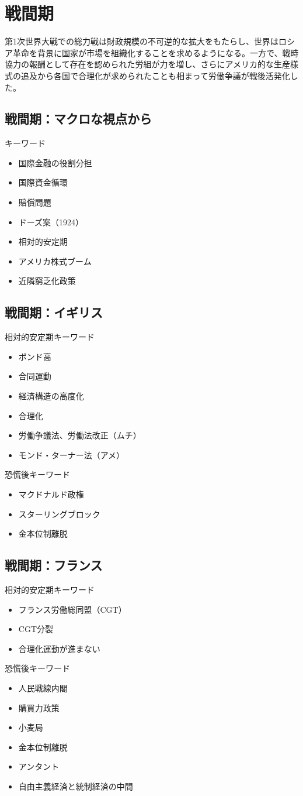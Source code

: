 \documentclass{jsarticle}
\begin{document}
\section{戦間期}
第1次世界大戦での総力戦は財政規模の不可逆的な拡大をもたらし、世界はロシア革命を背景に国家が市場を組織化することを求めるようになる。一方で、戦時協力の報酬として存在を認められた労組が力を増し、さらにアメリカ的な生産様式の追及から各国で合理化が求められたことも相まって労働争議が戦後活発化した。
\subsection{戦間期：マクロな視点から}
キーワード
\begin{itemize}
\item 国際金融の役割分担
\item 国際資金循環
\item 賠償問題
\item ドーズ案（1924）
\item 相対的安定期
\item アメリカ株式ブーム
\item 近隣窮乏化政策
\end{itemize}

\subsection{戦間期：イギリス}
相対的安定期キーワード
\begin{itemize}
\item ポンド高
\item 合同運動
\item 経済構造の高度化
\item 合理化
\item 労働争議法、労働法改正（ムチ）
\item モンド・ターナー法（アメ）
\end{itemize}
恐慌後キーワード
\begin{itemize}
\item マクドナルド政権
\item スターリングブロック
\item 金本位制離脱
\end{itemize}

\subsection{戦間期：フランス}
相対的安定期キーワード
\begin{itemize}
\item フランス労働総同盟（CGT）
\item CGT分裂
\item 合理化運動が進まない
\end{itemize}
恐慌後キーワード
\begin{itemize}
\item 人民戦線内閣
\item 購買力政策
\item 小麦局
\item 金本位制離脱
\item アンタント
\item 自由主義経済と統制経済の中間
\end{itemize}
\end{document}
